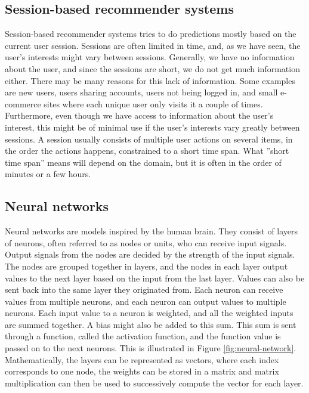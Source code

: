 \subsection{Session-based recommender systems}
Session-based recommender systems tries to do predictions mostly based on the current user session. Sessions are often limited in time, and, as we have seen, the user's interests might vary between sessions. Generally, we have no information about the user, and since the sessions are short, we do not get much information either. There may be many reasons for this lack of information. Some examples are new users, users sharing accounts, users not being logged in, and small e-commerce sites where each unique user only visits it a couple of times. Furthermore, even though we have access to information about the user's interest, this might be of minimal use if the user's interests vary greatly between sessions. A session usually consists of multiple user actions on several items, in the order the actions happens, constrained to a short time span. What ''short time span'' means will depend on the domain, but it is often in the order of minutes or a few hours.

\subsection{Neural networks}
Neural networks are models inspired by the human brain. They consist of layers of neurons, often referred to as nodes or units, who can receive input signals. Output signals from the nodes are decided by the strength of the input signals. The nodes are grouped together in layers, and the nodes in each layer output values to the next layer based on the input from the last layer. Values can also be sent back into the same layer they originated from. Each neuron can receive values from multiple neurons, and each neuron can output values to multiple neurons. Each input value to a neuron is weighted, and all the weighted inputs are summed together. A bias might also be added to this sum. This sum is sent through a function, called the activation function, and the function value is passed on to the next neurons. This is illustrated in Figure \ref{fig:neural-network}. Mathematically, the layers can be represented as vectors, where each index corresponds to one node, the weights can be stored in a matrix and matrix multiplication can then be used to successively compute the vector for each layer.

